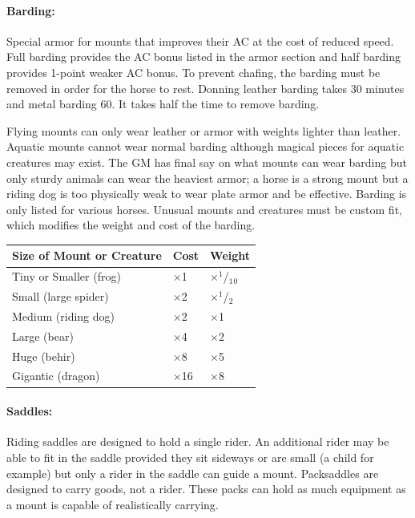 \begin{multicols}{2}
\begin{minipage}{\columnwidth}
\end{minipage}

\paragraph{Barding:} Special armor for mounts that improves their AC at the cost of reduced speed.  Full barding provides the AC bonus listed in the armor section and half barding provides 1-point weaker AC bonus.  To prevent chafing, the barding must be removed in order for the horse to rest.  Donning leather barding takes 30 minutes and metal barding 60.  It takes half the time to remove barding.

Flying mounts can only wear leather or armor with weights lighter than leather.  Aquatic mounts cannot wear normal barding although magical pieces for aquatic creatures may exist.  The GM has final say on what mounts can wear barding but only sturdy animals can wear the heaviest armor; a horse is a strong mount but a riding dog is too physically weak to wear plate armor and be effective.  Barding is only listed for various horses.  Unusual mounts and creatures must be custom fit, which modifies the weight and cost of the barding.

\noindent
\begin{minipage}{\columnwidth}

\label{unusualbarding}
\noindent
\begin{tabular}{|m{}|m{}|m{}|}
\hline
Size of Mount or Creature	& Cost	& Weight \\
\hline\hline
\rowcolor[gray]{.9}Tiny or Smaller (frog)	& $\times$1	& $\times$$^1$/$_1$$_0$ \\
Small (large spider)	& $\times$2	& $\times$$^1$/$_2$ \\
\rowcolor[gray]{.9}Medium (riding dog)	& $\times$2	& $\times$1 \\
Large (bear)	& $\times$4	& $\times$2 \\
\rowcolor[gray]{.9}Huge (behir)	& $\times$8	& $\times$5 \\
Gigantic (dragon)	& $\times$16	& $\times$8 \\
\hline
\end{tabular}

\end{minipage}

\paragraph{Saddles:} Riding saddles are designed to hold a single rider.  An additional rider may be able to fit in the saddle provided they sit sideways or are small (a child for example) but only a rider in the saddle can guide a mount.  Packsaddles are designed to carry goods, not a rider.  These packs can hold as much equipment as a mount is capable of realistically carrying.


\end{multicols}
